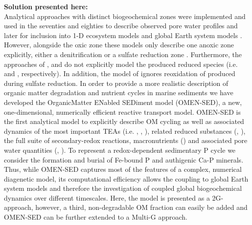 \documentclass[gmd, manuscript]{copernicus}
\begin{document}
\textbf{Solution presented here:}\\
Analytical approaches with distinct biogeochemical zones were implemented and used in the seventies and eighties to describe observed pore water profiles 
\citep[e.g.][]{vanderborght_vertical_1975, vanderborght_kinetic_1977, billen1982idealized, goloway_diagenetic_1982} and later for inclusion into 1-D ecosystem models \citep[e.g.][]{ruardij_benthic_1995} and 
global Earth system models \citep{tromp_global_1995}. 
However, alongside the oxic zone these models only describe one anoxic zone explicitly, either a denitrification \citep{vanderborght_vertical_1975, vanderborght_kinetic_1977, billen1982idealized, goloway_diagenetic_1982, ruardij_benthic_1995} 
or a sulfate reduction zone \citep{tromp_global_1995}. 
Furthermore, the approaches of \citet{vanderborght_vertical_1975}, \citet{goloway_diagenetic_1982} and \citet{tromp_global_1995} do not explicitly model the produced reduced 
species (i.e.  and , respectively). In addition, the model of \citet{tromp_global_1995} ignores reoxidation of  produced during sulfate reduction. 
In order to provide a more realistic description of organic matter degradation and nutrient cycles in marine sediments we have developed the OrganicMatter ENabled SEDiment model (OMEN-SED), 
a new, one-dimensional, numerically efficient reactive transport model. OMEN-SED is the first analytical model to explicitly describe OM cycling as well as associated dynamics of the most important TEAs 
(i.e. , , ), related reduced substances (, ), the full suite of secondary-redox reactions, macronutrients () and associated pore water quantities (, ). 
To represent a redox-dependent sedimentary P cycle we consider the formation and burial of Fe-bound P and authigenic Ca-P minerals. %
Thus, while OMEN-SED captures most of the features of a complex, numerical diagenetic model, its computational efficiency allows the coupling to global Earth system models and therefore the investigation of coupled global biogeochemical 
dynamics over different timescales. 
Here, the model is presented as a 2G-approach, however, a third, non-degradable OM fraction can easily be added and OMEN-SED can be further extended to a Multi-G approach. 
\end{document}
